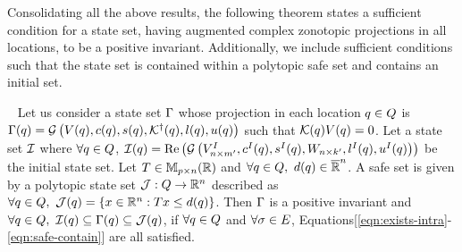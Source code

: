 Consolidating all the above results, the following theorem states a
sufficient condition for a state set, having augmented complex
zonotopic projections in all locations, to be a positive invariant.
Additionally, we include sufficient conditions such that the state set is
contained within a polytopic safe set and contains an initial set.

\begin{theorem}~\label{thm:main} Let us consider a state set
  $\Gamma$ whose projection in each location $q\in Q$
  is $\Gamma(q) =
  \mathcal{G}\left(V(q),c(q),s(q),\mathcal{K}^\dagger(q),l(q),u(q)\right)$
  such that $\mathcal{K}(q)V(q) = 0$.  Let a state set $\mathcal{I}$
  where $\forall q\in Q$,
  $\mathcal{I}(q)=\operatorname{\operatorname{Re}}\left(\mathcal{G}\left(V^I_{n\times
      m^\prime },c^I(q),s^I(q),W_{n\times
      k^\prime},l^I(q),u^I(q)\right)\right)$ be the initial state set.  Let $T\in\mathbb{M}_{p\times n}(\mathbb{R})$ and
  $\forall q\in Q,~d(q)\in\mathbb{\overline{R}}^n$.  A safe set
  is given by a polytopic
  state set $\mathcal{J}:Q\rightarrow\mathbb{R}^n$ described as $\forall
  q\in Q,~\mathcal{J}(q)=\left\{x\in\mathbb{R}^n:Tx\leq
  d(q)\right\}$.  Then $\Gamma$ is a positive
  invariant and $\forall
  q\in Q,~\mathcal{I}(q)\subseteq\Gamma(q)\subseteq
  \mathcal{J}(q)$, if $\forall q\in Q$ and $\forall
  \sigma\in E$,
  Equations[\ref{eqn:exists-intra}-\ref{eqn:safe-contain}] are all
  satisfied.
\end{theorem}